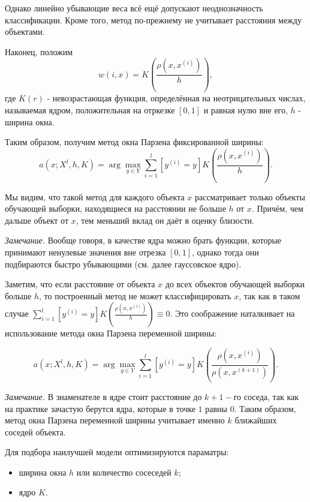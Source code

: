 Однако линейно убывающие веса всё ещё допускают неоднозначность классификации. Кроме того, метод по-прежнему не учитывает расстояния между объектами. 

Наконец, положим
\begin{equation*}
	\displaystyle w(i,x) = K\left(\frac{\rho(x, x^{(i)})}{h}\right),
\end{equation*}
где $K(r)$ - невозрастающая функция, определённая на неотрицательных числах, называемая ядром, положительная на отркезке $[0,1]$ и равная нулю вне его, $h$ - ширина окна. 

Таким образом, получим метод окна Парзена фиксированной ширины:
\begin{equation*}
	\displaystyle a(x; X^l, h, K) = \arg\max_{y\in Y} \sum\limits_{i=1}^l[y^{(i)}=y]K\left(\frac{\rho(x, x^{(i)})}{h}\right). 
\end{equation*}

Мы видим, что такой метод для каждого объекта $x$ рассматривает только объекты обучающей выборки, находящиеся на расстоянии не больше $h$ от $x$. Причём, чем дальше объект от $x$, тем  меньший вклад он даёт в оценку близости.

\textit{Замечание.} Вообще говоря, в качестве ядра можно брать функции, которые принимают ненулевые значения вне отрезка $[0,1]$, однако тогда они подбираются быстро убывающими (см. далее гауссовское ядро).

Заметим, что если расстояние от объекта $x$ до всех объектов обучающей выборки больше $h$, то построенный метод не может классифицировать $x$, так как в таком случае $\displaystyle\sum\limits_{i=1}^l[y^{(i)}=y]K\left(\frac{\rho(x, x^{(i)})}{h}\right) \equiv 0$. Это соображение наталкивает на использование метода окна Парзена переменной ширины:

\begin{equation*}
	\displaystyle a(x; X^l, h, K) = \arg\max_{y\in Y} \sum\limits_{i=1}^l[y^{(i)}=y]K\left(\frac{\rho(x, x^{(i)})}{\rho(x, x^{(k+1)})}\right). 
\end{equation*}

\textit{Замечание.} В знаменателе в ядре стоит расстояние до $k+1-$го соседа, так как на практике зачастую берутся ядра, которые в точке $1$ равны $0$. Таким образом, метод окна Парзена переменной ширины учитывает именно $k$ ближайших соседей объекта.

Для подбора наилучшей модели оптимизируются параматры:
\begin{itemize}
	\item ширина окна $h$ или количество сосеседей $k$;
	\item ядро $K$.
\end{itemize}

